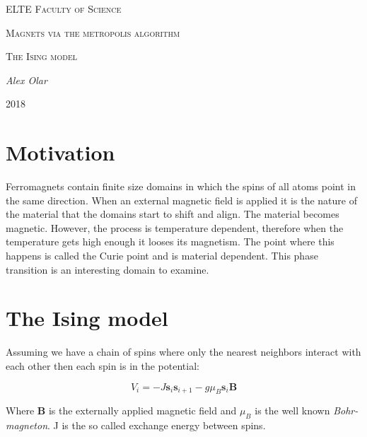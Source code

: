 \documentclass[a4paper,12pt]{article}
\begin{document}
\begin{titlepage}

	\centering
	{\scshape\LARGE ELTE Faculty of Science\par}
	\vspace{3cm}
	{\scshape\Large Magnets via the metropolis algorithm\par}
    \vspace{1cm}
    {\scshape\large The Ising model\par}
    \vspace{1cm}
	{\large\itshape Alex Olar \par}
    \vspace{3cm}
    \vfill
	{\large 2018 \par}

\end{titlepage}

\onehalfspacing

\section{Motivation}

\par Ferromagnets contain finite size domains in which the spins of all atoms
point in the same direction. When an external magnetic field is applied it is
the nature of the material that the domains start to shift and align. The material
becomes magnetic. However, the process is temperature dependent, therefore when
the temperature gets high enough it looses its magnetism. The point where this 
happens is called the Curie point and is material dependent. This phase transition
is an interesting domain to examine.

\section{The Ising model}

\par Assuming we have a chain of spins where only the nearest neighbors
interact with each other then each spin is in the potential:

\begin{equation*}
    V_{i} = -J\textbf{s}_{i}\textbf{s}_{i+1} - g\mu_{B}\textbf{s}_{i}\textbf{B}
\end{equation*}

\par Where \textbf{B} is the externally applied magnetic field and $\mu_{B}$
is the well known \textit{Bohr-magneton}. J is the so called exchange energy
between spins.
\end{document}
